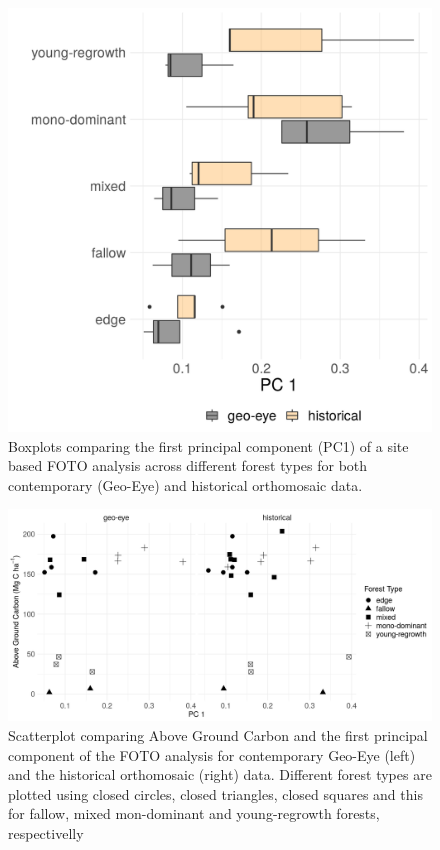 \documentclass[landscape]{article}
\begin{document}
\begin{figure}
\includegraphics[width=14.58in,height=0.5\textheight]{./figures/foto_bplot_psp} \caption{Boxplots comparing the first principal component (PC1) of a site based FOTO analysis across different forest types for both contemporary (Geo-Eye) and historical orthomosaic data.}\label{fig:unnamed-chunk-5}
\end{figure}

\begin{figure}
\includegraphics[width=0.75\linewidth]{./figures/foto_pc1_agc} \caption{Scatterplot comparing Above Ground Carbon and the first principal component of the FOTO analysis for contemporary Geo-Eye (left) and the historical orthomosaic (right) data. Different forest types are plotted using closed circles, closed triangles, closed squares and this for fallow, mixed mon-dominant and young-regrowth forests, respectivelly }\label{fig:unnamed-chunk-6}
\end{figure}
\end{document}
